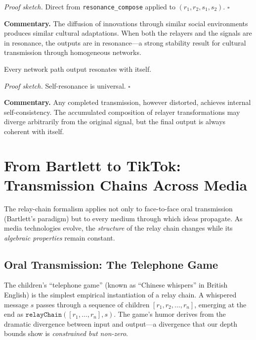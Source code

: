 \noindent\textit{Proof sketch.}\quad
Direct from \texttt{resonance\_compose} applied to $(r_1, r_2, s_1, s_2)$.
\hfill$\square$

\medskip

\noindent\textbf{Commentary.}
The diffusion of innovations through similar social environments produces
similar cultural adaptations.  When both the relayers and the signals are in
resonance, the outputs are in resonance---a strong stability result for
cultural transmission through homogeneous networks.

\begin{theorem}
\label{thm:path_self_resonance}
Every network path output resonates with itself.
\end{theorem}

\noindent\textit{Proof sketch.}\quad
Self-resonance is universal.
\hfill$\square$

\medskip

\noindent\textbf{Commentary.}
Any completed transmission, however distorted, achieves internal
self-consistency.  The accumulated composition of relayer transformations
may diverge arbitrarily from the original signal, but the final output is
always coherent with itself.

\section{From Bartlett to TikTok: Transmission Chains Across Media}
\label{sec:ch18-bartlett-tiktok}

The relay-chain formalism applies not only to face-to-face oral
transmission (Bartlett's paradigm) but to every medium through which ideas
propagate.  As media technologies evolve, the \emph{structure} of the relay
chain changes while its \emph{algebraic properties} remain constant.

\subsection{Oral Transmission: The Telephone Game}

The children's ``telephone game'' (known as ``Chinese whispers'' in British
English) is the simplest empirical instantiation of a relay chain.  A
whispered message $s$ passes through a sequence of children
$[r_1, r_2, \ldots, r_n]$, emerging at the end as
$\texttt{relayChain}([r_1, \ldots, r_n], s)$.  The game's humor derives
from the dramatic divergence between input and output---a divergence that
our depth bounds show is \emph{constrained but non-zero}.

